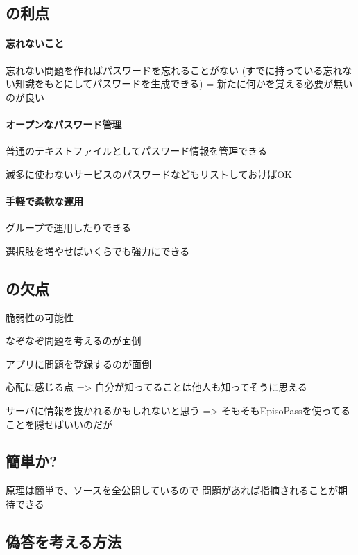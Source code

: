 \documentclass[twoside]{wiss}
\begin{document}
\subsection{{\EP}の利点}

\paragraph{忘れないこと}

忘れない問題を作ればパスワードを忘れることがない
(すでに持っている忘れない知識をもとにしてパスワードを生成できる)
 = 新たに何かを覚える必要が無いのが良い

\paragraph{オープンなパスワード管理}

普通のテキストファイルとしてパスワード情報を管理できる

滅多に使わないサービスのパスワードなどもリストしておけばOK

\paragraph{手軽で柔軟な運用}

グループで運用したりできる

選択肢を増やせばいくらでも強力にできる

\subsection{{\EP}の欠点}

脆弱性の可能性

なぞなぞ問題を考えるのが面倒

アプリに問題を登録するのが面倒

心配に感じる点
 => 自分が知ってることは他人も知ってそうに思える

サーバに情報を抜かれるかもしれないと思う
 => そもそもEpisoPassを使ってることを隠せばいいのだが

\subsection{簡単か?}

原理は簡単で、ソースを全公開しているので
問題があれば指摘されることが期待できる

\subsection{偽答を考える方法}
\end{document}

